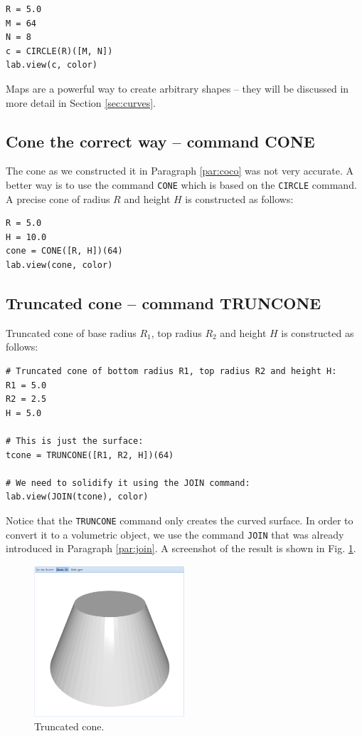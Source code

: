 \documentclass{article}
\begin{document}
\begin{verbatim}
R = 5.0
M = 64
N = 8
c = CIRCLE(R)([M, N])
lab.view(c, color)
\end{verbatim}
Maps are a powerful way to create arbitrary shapes -- they will be discussed in 
more detail in Section \ref{sec:curves}.

\subsection{Cone the correct way -- command CONE}

The cone as we constructed it in Paragraph \ref{par:coco} was not 
very accurate. A better way is to use the command {\tt CONE} which 
is based on the {\tt CIRCLE} command. A precise cone of radius 
$R$ and height $H$ is constructed as follows:
\begin{verbatim}
R = 5.0
H = 10.0
cone = CONE([R, H])(64)
lab.view(cone, color)
\end{verbatim}

\subsection{Truncated cone -- command TRUNCONE}

Truncated cone of base radius $R_1$, top radius $R_2$ and height $H$
is constructed as follows:

\begin{verbatim}
# Truncated cone of bottom radius R1, top radius R2 and height H:
R1 = 5.0
R2 = 2.5
H = 5.0

# This is just the surface:
tcone = TRUNCONE([R1, R2, H])(64)

# We need to solidify it using the JOIN command:
lab.view(JOIN(tcone), color)
\end{verbatim}
Notice that the {\tt TRUNCONE} command only creates the curved surface.
In order to convert it to a volumetric object, we use the command 
{\tt JOIN} that was already introduced in Paragraph \ref{par:join}.
A screenshot of the result is shown in Fig. \ref{fig:tcone}.


\begin{figure}[!ht]
\begin{center}
\includegraphics[width=0.5\textwidth]{img/tcone.png}
\end{center}
\vspace{-2mm}
\caption{Truncated cone.}
\label{fig:tcone}
\end{figure}
\end{document}
